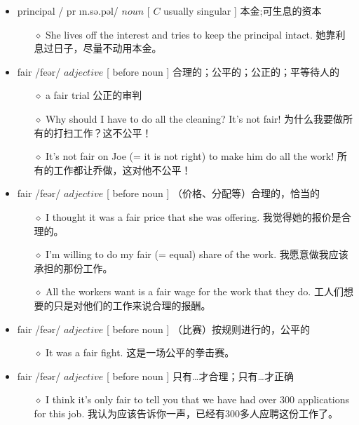 \documentclass[a4paper,top=2.5cm,buttom=2.5cm10.5pt]{book}
\begin{document}
\begin{itemize}
\item principal / \textprimstress pr \i n.sə.pəl/ $ noun $ [  $ C $  usually singular ] 本金;可生息的资本
\begin{itemize}
\item[$\diamond$] She lives off the interest and tries to keep the principal intact.
她靠利息过日子，尽量不动用本金。
\end{itemize}
\end{itemize}
\begin{itemize}
\item fair /feər/ $ adjective $ [ before noun ] 合理的；公平的；公正的；平等待人的
\begin{itemize}
\item[$\diamond$] a fair trial
公正的审判
\item[$\diamond$] Why should I have to do all the cleaning? It's not fair!
为什么我要做所有的打扫工作？这不公平！
\item[$\diamond$] It's not fair on Joe (= it is not right) to make him do all the work!
所有的工作都让乔做，这对他不公平！
\end{itemize}
\end{itemize}
\begin{itemize}
\item fair /feər/ $ adjective $ [ before noun ] （价格、分配等）合理的，恰当的
\begin{itemize}
\item[$\diamond$] I thought it was a fair price that she was offering.
我觉得她的报价是合理的。
\item[$\diamond$] I'm willing to do my fair (= equal) share of the work.
我愿意做我应该承担的那份工作。
\item[$\diamond$] All the workers want is a fair wage for the work that they do.
工人们想要的只是对他们的工作来说合理的报酬。
\end{itemize}
\end{itemize}
\begin{itemize}
\item fair /feər/ $ adjective $ [ before noun ] （比赛）按规则进行的，公平的
\begin{itemize}
\item[$\diamond$] It was a fair fight.
这是一场公平的拳击赛。
\end{itemize}
\end{itemize}
\begin{itemize}
\item fair /feər/ $ adjective $ [ before noun ] 只有…才合理；只有…才正确
\begin{itemize}
\item[$\diamond$] I think it's only fair to tell you that we have had over 300 applications for this job.
我认为应该告诉你一声，已经有300多人应聘这份工作了。
\end{itemize}
\end{itemize}
\end{document}
